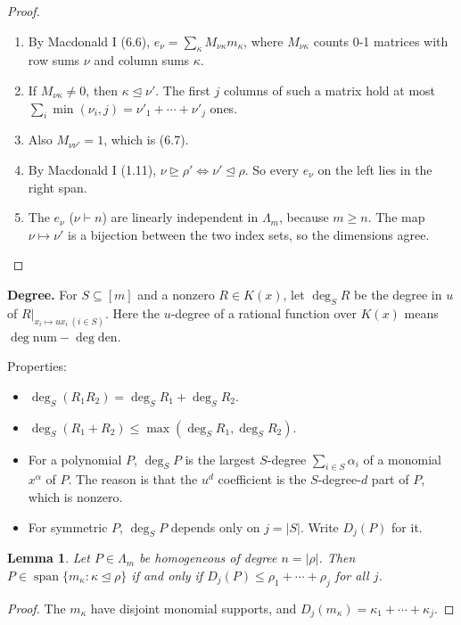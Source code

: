 \documentclass[11pt]{article}
\newtheorem{genericlemma}{Lemma}
\newenvironment{lem}[1]{\renewcommand{\thegenericlemma}{#1}\begin{genericlemma}}{\end{genericlemma}}
\theoremstyle{definition}
\newcommand{\dom}{\trianglerighteq}
\newcommand{\domd}{\trianglelefteq}
\begin{document}
\begin{proof}
\leavevmode
\begin{enumerate}
\item By Macdonald I (6.6), $e_\nu = \sum_\kappa M_{\nu\kappa} m_\kappa$, where $M_{\nu\kappa}$ counts 0-1 matrices with row sums $\nu$ and column sums $\kappa$.
\item If $M_{\nu\kappa} \ne 0$, then $\kappa \domd \nu'$. The first $j$ columns of such a matrix hold at most $\sum_i \min(\nu_i, j) = \nu'_1+\cdots+\nu'_j$ ones.
\item Also $M_{\nu\nu'} = 1$, which is (6.7).
\item By Macdonald I (1.11), $\nu \dom \rho' \iff \nu' \domd \rho$. So every $e_\nu$ on the left lies in the right span.
\item The $e_\nu$ ($\nu \vdash n$) are linearly independent in $\Lambda_m$, because $m \ge n$. The map $\nu \mapsto \nu'$ is a bijection between the two index sets, so the dimensions agree. \qedhere
\end{enumerate}
\end{proof}

\noindent\textbf{Degree.} For $S \subseteq [m]$ and a nonzero $R \in K(x)$, let $\deg_S R$ be the degree in $u$ of $R|_{x_i \mapsto u x_i\ (i\in S)}$. Here the $u$-degree of a rational function over $K(x)$ means $\deg \text{num} - \deg \text{den}$.

\noindent Properties:
\begin{itemize}
\item $\deg_S(R_1R_2) = \deg_S R_1 + \deg_S R_2$.
\item $\deg_S(R_1 + R_2) \le \max(\deg_S R_1, \deg_S R_2)$.
\item For a polynomial $P$, $\deg_S P$ is the largest $S$-degree $\sum_{i\in S} \alpha_i$ of a monomial $x^\alpha$ of $P$. The reason is that the $u^d$ coefficient is the $S$-degree-$d$ part of $P$, which is nonzero.
\item For symmetric $P$, $\deg_S P$ depends only on $j = |S|$. Write $D_j(P)$ for it.
\end{itemize}

\begin{lem}{1.2}
Let $P \in \Lambda_m$ be homogeneous of degree $n = |\rho|$. Then $P \in \operatorname{span}\{m_\kappa : \kappa \domd \rho\}$ if and only if $D_j(P) \le \rho_1+\cdots+\rho_j$ for all $j$.
\end{lem}

\begin{proof}
The $m_\kappa$ have disjoint monomial supports, and $D_j(m_\kappa) = \kappa_1+\cdots+\kappa_j$.
\end{proof}
\end{document}
